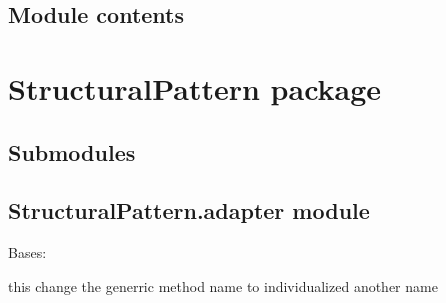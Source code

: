 \documentclass[letterpaper,10pt,english]{sphinxmanual}
\begin{document}
\subsection{Module contents}
\label{\detokenize{GangOfFour:module-GangOfFour}}\label{\detokenize{GangOfFour:module-contents}}
\sphinxstepscope


\section{StructuralPattern package}
\label{\detokenize{StructuralPattern:structuralpattern-package}}\label{\detokenize{StructuralPattern::doc}}

\subsection{Submodules}
\label{\detokenize{StructuralPattern:submodules}}

\subsection{StructuralPattern.adapter module}
\label{\detokenize{StructuralPattern:module-StructuralPattern.adapter}}\label{\detokenize{StructuralPattern:structuralpattern-adapter-module}}

\begin{fulllineitems}
\label{\detokenize{StructuralPattern:StructuralPattern.adapter.Adapter}}
\pysigstartsignatures
{}
\pysigstopsignatures
\sphinxAtStartPar
Bases: 

\sphinxAtStartPar
this change the generric method name to individualized another name

\end{fulllineitems}

\end{document}

